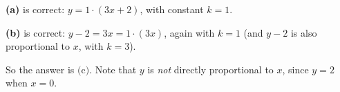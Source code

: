 \textbf{(a)} is correct: $y=1\cdot(3x+2)$, with constant $k=1$.

\textbf{(b)} is correct: $y-2=3x=1\cdot(3x)$, again with $k=1$ (and $y-2$ is also proportional to $x$, with $k=3$).

So the answer is $\boxed{\text{(c)}}$. Note that $y$ is \emph{not} directly proportional to $x$, since $y=2$ when $x=0$.
